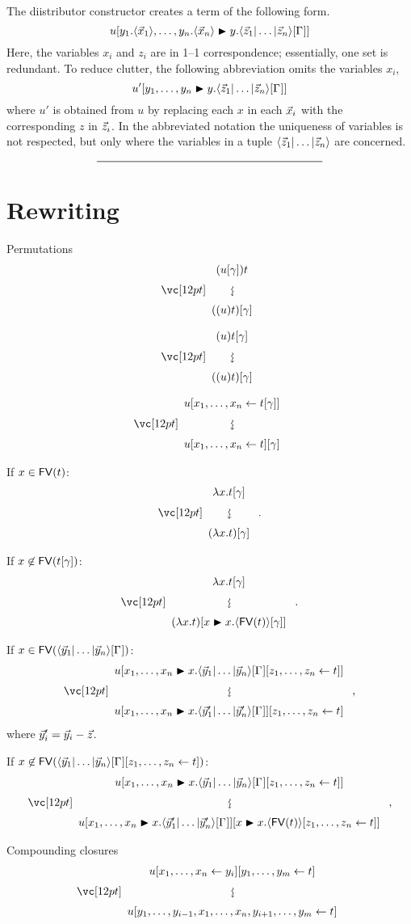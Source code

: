 \documentclass{amsart}
\begin{document}


The diistributor constructor creates a term of the following form.
\[
	u\diistr*{y_1.\tup*{\vv*x_1},\ldots,y_n.\tup*{\vv*x_n}}y{\ttup*z\G}
\]
Here, the variables $x_i$ and $z_i$ are in 1--1 correspondence; essentially, one set is redundant.
%
To reduce clutter, the following abbreviation omits the variables $x_i$,
\[
	u'\diistr yy{\ttup*z\G}
\]
where $u'$ is obtained from $u$ by replacing each $x$ in each $\vv*x_i$ with the corresponding $z$ in $\vv*z_i$.
%
In the abbreviated notation the uniqueness of variables is not respected, but only where the variables in a tuple $\ttup*z$ are concerned.


\[
	\rule{200pt}{.5pt}
\]


\section*{Rewriting}

\noindent
Permutations
\[
\displayrewrite
{ (u\g)t }
{ ((u)t)\g }
\]

\bigskip

\[
\displayrewrite
{ (u)t\g }
{ ((u)t)\g }
\]

\[
\displayrewrite
{ u\share x{t\g} }
{ u\share xt\g }
\]

\noindent
If $x\in{\mathop{\mathsf{FV}}}(t)$:
\[
\displayrewrite
{ \lambda x. t\g }
{ (\lambda x. t) \g }\;.
\]

\noindent
If $x\not\in\FV(t\g)$:
\[
\displayrewrite
{ \lambda x. t\g }
{ (\lambda x. t) \diistr* xx{\tup*{\FV(t)}\g} }\;.
\]

\noindent
If $x\in\FV(\ttup*y\G)$:
\[
\displayrewrite
  { u\diistr xx{\ttup*y\G\share zt} }
  { u\diistr xx{\ttup{\vv*y'}\G}\share zt }\;,
\]
where $\vv*y'_i=\vv*y_i-\vv*z$.

\bigskip

\noindent
If $x\not\in\FV(\ttup*y\G\share zt)$:
\[
\displayrewrite
  { u\diistr xx{\ttup*y\G\share zt} }
  { u\diistr xx{\ttup{\vv*y'}\G} \diistr* xx{\tup*{\FV(t)}\share zt } }\;,
\]

\bigskip
\bigskip
\bigskip

\noindent
Compounding closures
\[
\displayrewrite
{ u\share x{y_i}\share[m] yt }
{ u\share* {y_1, \dotsc, y_{i-1}, \vv x, y_{i+1}, \dotsc, y_m}t }
\]

\bigskip
\end{document}
